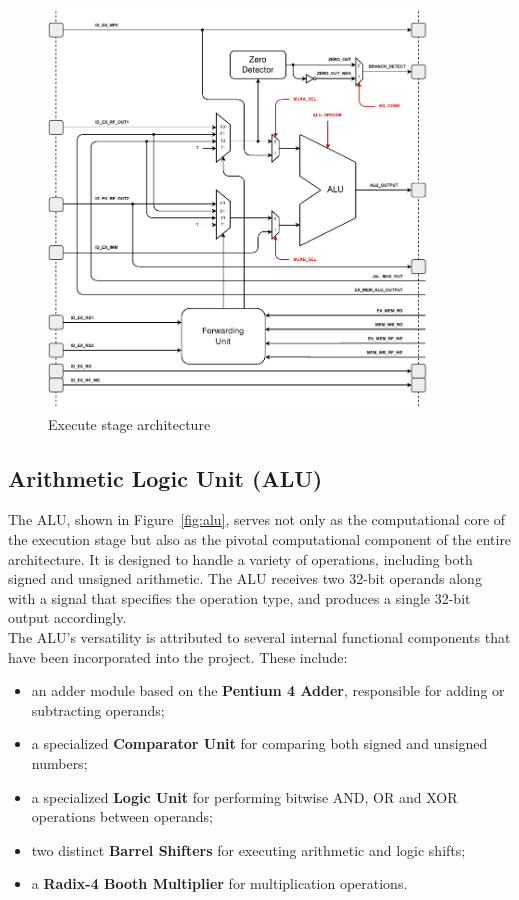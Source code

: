 \begin{figure}[!htbp]
    \centering
    \includegraphics[width=0.9\textwidth]{source/figures/03_execute.pdf}
    \caption{Execute stage architecture}
    \label{fig:03_execute}
\end{figure}

\subsection{Arithmetic Logic Unit (ALU)}
The ALU, shown in Figure~\ref{fig:alu}, serves not only as the computational core of the execution stage but also as the pivotal computational component of the entire architecture. It is designed to handle a variety of operations, including both signed and unsigned arithmetic. The ALU receives two 32-bit operands along with a signal that specifies the operation type, and produces a single 32-bit output accordingly. \\

The ALU's versatility is attributed to several internal functional components that have been incorporated into the project. These include:

\begin{itemize}%
    \item an adder module based on the \textbf{Pentium 4 Adder}, responsible for adding or subtracting operands;
    \item a specialized \textbf{Comparator Unit} for comparing both signed and unsigned numbers;
    \item a specialized \textbf{Logic Unit} for performing bitwise AND, OR and XOR operations between operands;
    \item two distinct \textbf{Barrel Shifters} for executing arithmetic and logic shifts;
    \item a \textbf{Radix-4 Booth Multiplier} for multiplication operations.
\end{itemize}

